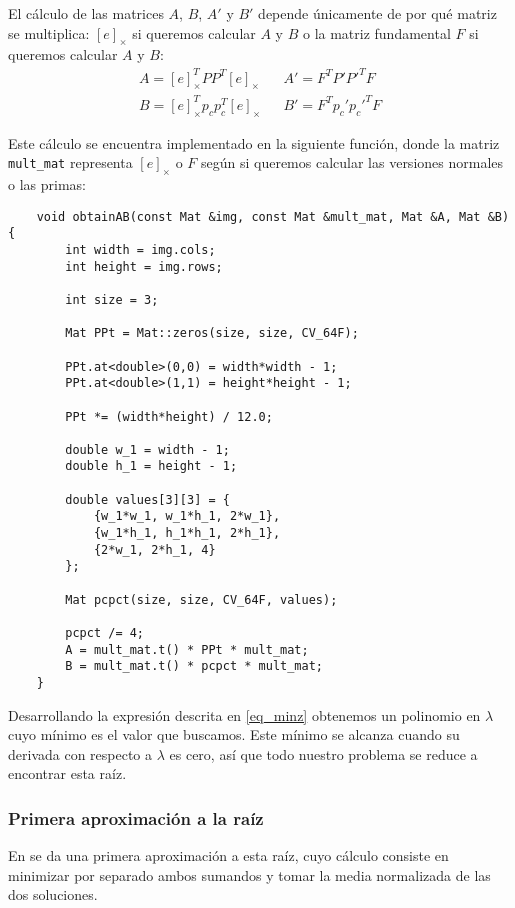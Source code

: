 \documentclass[a4paper, 11pt]{article}
\theoremstyle{definition}
\begin{document}
    El cálculo de las matrices $A$, $B$, $A'$ y $B'$ depende únicamente de por qué matriz se multiplica: $[e]_\times$ si queremos calcular $A$ y $B$ o la matriz fundamental $F$ si queremos calcular $A$ y $B$:
    \begin{align*}
        A = [e]_\times^T P P^T [e]_\times && A' = F^T P' P'^T F \\
        B = [e]_\times^T p_c p_c^T [e]_\times && B' = F^T p_c' p_c'^T F
    \end{align*}

    Este cálculo se encuentra implementado en la siguiente función, donde la matriz \lstinline{mult_mat} representa $[e]_\times$ o $F$ según si queremos calcular las versiones normales o las primas:
    \begin{lstlisting}
    void obtainAB(const Mat &img, const Mat &mult_mat, Mat &A, Mat &B){
        int width = img.cols;
        int height = img.rows;

        int size = 3;

        Mat PPt = Mat::zeros(size, size, CV_64F);

        PPt.at<double>(0,0) = width*width - 1;
        PPt.at<double>(1,1) = height*height - 1;

        PPt *= (width*height) / 12.0;

        double w_1 = width - 1;
        double h_1 = height - 1;

        double values[3][3] = {
            {w_1*w_1, w_1*h_1, 2*w_1},
            {w_1*h_1, h_1*h_1, 2*h_1},
            {2*w_1, 2*h_1, 4}
        };

        Mat pcpct(size, size, CV_64F, values);

        pcpct /= 4;
        A = mult_mat.t() * PPt * mult_mat;
        B = mult_mat.t() * pcpct * mult_mat;
    }
    \end{lstlisting}

    Desarrollando la expresión descrita en \ref{eq_minz} obtenemos un polinomio en $\lambda$ cuyo mínimo es el valor que buscamos. Este mínimo se alcanza cuando su derivada con respecto a $\lambda$ es cero, así que todo nuestro problema se reduce a encontrar esta raíz.

    \subsubsection{Primera aproximación a la raíz}

    En \cite{LoopZhang} se da una primera aproximación a esta raíz, cuyo cálculo consiste en minimizar por separado ambos sumandos y tomar la media normalizada de las dos soluciones.
\end{document}
